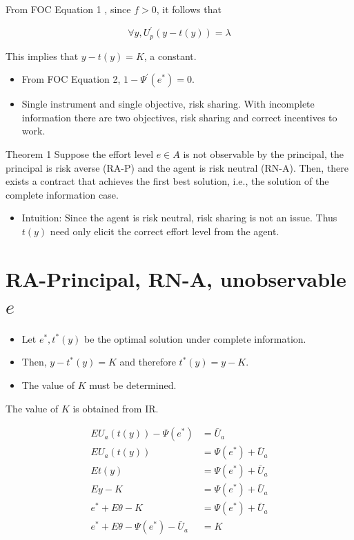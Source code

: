 \documentclass[10pt]{article}
\begin{document}
From FOC Equation 1 , since $f>0$, it follows that

$$
\forall y, U_{p}^{\prime}(y-t(y))=\lambda
$$

This implies that $y-t(y)=K$, a constant.

\begin{itemize}
  \item From FOC Equation 2, $1-\Psi^{\prime}\left(e^{*}\right)=0$.
  \item Single instrument and single objective, risk sharing. With incomplete information there are two objectives, risk sharing and correct incentives to work.
\end{itemize}

Theorem 1 Suppose the effort level $e \in A$ is not observable by the principal, the principal is risk averse (RA-P) and the agent is risk neutral (RN-A). Then, there exists a contract that achieves the first best solution, i.e., the solution of the complete information case.

\begin{itemize}
  \item Intuition: Since the agent is risk neutral, risk sharing is not an issue. Thus $t(y)$ need only elicit the correct effort level from the agent.
\end{itemize}

\section*{RA-Principal, RN-A, unobservable $e$}
\begin{itemize}
  \item Let $e^{*}, t^{*}(y)$ be the optimal solution under complete information.
  \item Then, $y-t^{*}(y)=K$ and therefore $t^{*}(y)=y-K$.
  \item The value of $K$ must be determined.
\end{itemize}

The value of $K$ is obtained from IR.

$$
\begin{aligned}
E U_{a}(t(y))-\Psi\left(e^{*}\right) & =\bar{U}_{a} \\
E U_{a}(t(y)) & =\Psi\left(e^{*}\right)+\bar{U}_{a} \\
E t(y) & =\Psi\left(e^{*}\right)+\bar{U}_{a} \\
E y-K & =\Psi\left(e^{*}\right)+\bar{U}_{a} \\
e^{*}+E \theta-K & =\Psi\left(e^{*}\right)+\bar{U}_{a} \\
e^{*}+E \theta-\Psi\left(e^{*}\right)-\bar{U}_{a} & =K
\end{aligned}
$$
\end{document}
